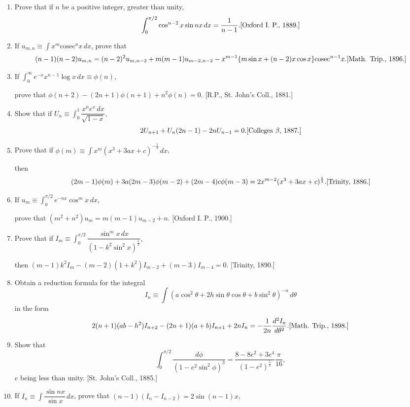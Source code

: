 \documentclass[11pt, a4paper]{article}
\newcommand{\source}[1]{\hfill\textnormal{[#1]}}
\begin{document}
\begin{enumerate}[leftmargin=2em]
\item Prove that if $n$ be a positive integer, greater than unity,
\[
\int_0^{\pi/2}\cos^{n-2}x\sin nx\,dx=\dfrac{1}{n-1}. \source{Oxford I. P., 1889.}
\]

\item If $u_{m,n}\equiv\displaystyle\int x^m\text{cosec}^nx\,dx$, prove that
\[
(n-1)(n-2)u_{m,n}=(n-2)^2u_{m,n-2}+m(m-1)u_{m-2,n-2}
-x^{m-1}\{m\sin x+(n-2)x\cos x\}\text{cosec}^{n-1}x. \source{Math. Trip., 1896.}
\]

\item If $\displaystyle\int_0^\infty e^{-x}x^{n-1}\log x\,dx\equiv\phi(n)$,

prove that $\phi(n+2)-(2n+1)\phi(n+1)+n^2\phi(n)=0$. \source{R.P., St. John's Coll., 1881.}

\item Show that if $U_n\equiv\displaystyle\int_0^1 \dfrac{x^ne^x\,dx}{\sqrt{1-x}}$,
\[
2U_{n+1}+U_n(2n-1)-2nU_{n-1}=0. \source{Colleges $\beta$, 1887.}
\]

\item Prove that if $\phi(m)\equiv\displaystyle\int x^m(x^3+3ax+c)^{-\frac12}\,dx$,

then
\[
(2m-1)\phi(m)+3a(2m-3)\phi(m-2)+(2m-4)c\phi(m-3)
=2x^{m-2}(x^3+3ax+c)^{\frac12}. \source{Trinity, 1886.}
\]

\item If $u_m\equiv\displaystyle\int_0^{\pi/2}e^{-nx}\cos^mx\,dx$,

prove that $(m^2+n^2)u_m=m(m-1)u_{m-2}+n$. \source{Oxford I. P., 1900.}

\item Prove that if $I_m\equiv\displaystyle\int_0^{\pi/2}\dfrac{\sin^mx\,dx}{(1-k^2\sin^2x)^{\frac12}}$,

then $(m-1)k^2I_m-(m-2)(1+k^2)I_{m-2}+(m-3)I_{m-4}=0$. \source{Trinity, 1890.}

\item Obtain a reduction formula for the integral
\[
I_n\equiv\int (a\cos^2\theta+2h\sin\theta\cos\theta+b\sin^2\theta)^{-n}\,d\theta
\]
in the form
\[
2(n+1)(ab-h^2)I_{n+2}-(2n+1)(a+b)I_{n+1}+2nI_n=-\dfrac{1}{2n}\dfrac{d^2I_n}{d\theta^2}. \source{Math. Trip., 1898.}
\]

\item Show that
\[
\int_0^{\pi/2}\dfrac{d\phi}{(1-e^2\sin^2\phi)^3}=\dfrac{8-8e^2+3e^4}{(1-e^2)^{\frac52}}\dfrac{\pi}{16},
\]
$e$ being less than unity. \source{St. John's Coll., 1885.}

\item If $I_n\equiv\displaystyle\int \dfrac{\sin nx}{\sin x}\,dx$, prove that $(n-1)(I_n-I_{n-2})=2\sin(n-1)x$,


\end{enumerate}
\end{document}
